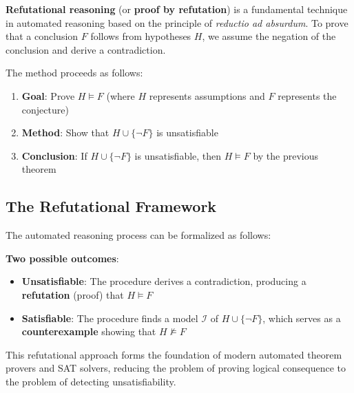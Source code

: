 \documentclass[11pt,a4paper]{article}
\theoremstyle{definition}
\theoremstyle{plain}
\theoremstyle{remark}
\begin{document}
\textbf{Refutational reasoning} (or \textbf{proof by refutation}) is a fundamental technique in automated reasoning based on the principle of \textit{reductio ad absurdum}. To prove that a conclusion $F$ follows from hypotheses $H$, we assume the negation of the conclusion and derive a contradiction.

The method proceeds as follows:
\begin{enumerate}
    \item \textbf{Goal}: Prove $H \models F$ (where $H$ represents assumptions and $F$ represents the conjecture)
    \item \textbf{Method}: Show that $H \cup \{\neg F\}$ is unsatisfiable
    \item \textbf{Conclusion}: If $H \cup \{\neg F\}$ is unsatisfiable, then $H \models F$ by the previous theorem
\end{enumerate}

\subsection{The Refutational Framework}

The automated reasoning process can be formalized as follows:

\begin{center}
\end{center}

\textbf{Two possible outcomes}:
\begin{itemize}
    \item \textbf{Unsatisfiable}: The procedure derives a contradiction, producing a \textbf{refutation} (proof) that $H \models F$
    \item \textbf{Satisfiable}: The procedure finds a model $\mathcal{I}$ of $H \cup \{\neg F\}$, which serves as a \textbf{counterexample} showing that $H \not\models F$
\end{itemize}

This refutational approach forms the foundation of modern automated theorem provers and SAT solvers, reducing the problem of proving logical consequence to the problem of detecting unsatisfiability.
\end{document}
